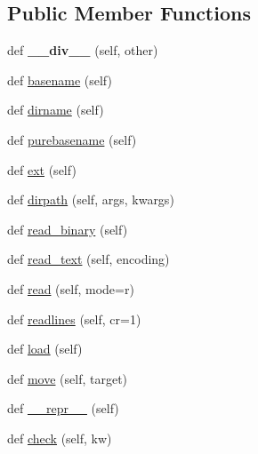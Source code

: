 \subsection*{Public Member Functions}
\begin{DoxyCompactItemize}
\item 
\mbox{\label{classpy_1_1__path_1_1common_1_1_path_base_aa64576dae0a7e1f7c40bbd244c17860c}} 
def {\bfseries \+\_\+\+\_\+div\+\_\+\+\_\+} (self, other)
\item 
def \hyperlink{classpy_1_1__path_1_1common_1_1_path_base_a786c6ac2c1cbd75fbe73bef3f887583b}{basename} (self)
\item 
def \hyperlink{classpy_1_1__path_1_1common_1_1_path_base_a715389005352031624fa57678074ad8a}{dirname} (self)
\item 
def \hyperlink{classpy_1_1__path_1_1common_1_1_path_base_a0f5564d9257d7dfb42ace20f74899d01}{purebasename} (self)
\item 
def \hyperlink{classpy_1_1__path_1_1common_1_1_path_base_a6b63c5d5b530c6e937bc030e611f295a}{ext} (self)
\item 
def \hyperlink{classpy_1_1__path_1_1common_1_1_path_base_a0128f83902ae05ea9262d284b5c80946}{dirpath} (self, args, kwargs)
\item 
def \hyperlink{classpy_1_1__path_1_1common_1_1_path_base_aa22b375f14cebead0980bce7b7c98cd7}{read\+\_\+binary} (self)
\item 
def \hyperlink{classpy_1_1__path_1_1common_1_1_path_base_aef8d2c84334942e23887f158467509de}{read\+\_\+text} (self, encoding)
\item 
def \hyperlink{classpy_1_1__path_1_1common_1_1_path_base_abf6d5e377fbfde2669cf1148a100aec4}{read} (self, mode=\textquotesingle{}r\textquotesingle{})
\item 
def \hyperlink{classpy_1_1__path_1_1common_1_1_path_base_a5fb6556781558ab4c7cc7c64d28959a6}{readlines} (self, cr=1)
\item 
def \hyperlink{classpy_1_1__path_1_1common_1_1_path_base_a01b4c43a65e2187e05160485645d7c74}{load} (self)
\item 
def \hyperlink{classpy_1_1__path_1_1common_1_1_path_base_a27bea9b9d4031d0063294cbbf3735ef9}{move} (self, target)
\item 
def \hyperlink{classpy_1_1__path_1_1common_1_1_path_base_a706f9ca2e0879b88fbebaccc18952775}{\+\_\+\+\_\+repr\+\_\+\+\_\+} (self)
\item 
def \hyperlink{classpy_1_1__path_1_1common_1_1_path_base_a6daedaef42f89446c07a1d9b0b5d52b6}{check} (self, kw)

\end{DoxyCompactItemize}
